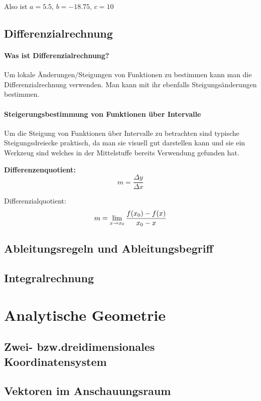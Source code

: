 \documentclass{article}
\begin{document}
Also ist $a=5.5$, $b=-18.75$, $c=10$

\subsection{Differenzialrechnung}
\paragraph{Was ist Differenzialrechnung?}
Um lokale Änderungen/Steigungen von Funktionen zu bestimmen kann man die Differenzialrechnung verwenden.
Man kann mit ihr ebenfalls Steigungsänderungen bestimmen.
\paragraph{Steigerungsbestimmung von Funktionen über Intervalle}
Um die Steigung von Funktionen über Intervalle zu betrachten sind typische Steigungsdreiecke praktisch,
da man sie visuell gut darstellen kann und sie ein Werkzeug sind welches in der Mittelstuffe bereits
Verwendung gefunden hat.

\bf{Differenzenquotient:}
\[
    m = {\frac {\Delta y} {\Delta x}}
\]

Differenzialquotient:
\[
    m = \lim_{x \to x_{0}} {{f(x_{0}) - f(x)} \over { x_{0} - x}}
\]



\paragraph{}

\subsection{Ableitungsregeln und Ableitungsbegriff}
\subsection{Integralrechnung}

\section{Analytische Geometrie}
\subsection{Zwei- bzw.dreidimensionales Koordinatensystem}
\subsection{Vektoren im Anschauungsraum}
\end{document}

